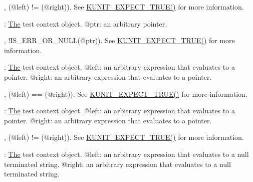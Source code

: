 \begin{DoxyRefList}
\label{test__test000035}%
%
, (@left) != (@right)). See \mbox{\hyperlink{test_8h_a0dcf3441be7037d8702d620899bf33fa}{K\+U\+N\+I\+T\+\_\+\+E\+X\+P\+E\+C\+T\+\_\+\+T\+R\+U\+E()}} for more information.  
\item[Member \mbox{\hyperlink{test_8h_a646deaf74fd5cf9d59403cea89898414}{K\+U\+N\+I\+T\+\_\+\+E\+X\+P\+E\+C\+T\+\_\+\+N\+O\+T\+\_\+\+E\+R\+R\+\_\+\+O\+R\+\_\+\+N\+U\+LL}} (test, ptr)]\label{test__test000050}%
%
\+: \mbox{\hyperlink{classThe}{The}} test context object. @ptr\+: an arbitrary pointer.

\label{test__test000051}%
%
, !\+I\+S\+\_\+\+E\+R\+R\+\_\+\+O\+R\+\_\+\+N\+U\+LL(@ptr)). See \mbox{\hyperlink{test_8h_a0dcf3441be7037d8702d620899bf33fa}{K\+U\+N\+I\+T\+\_\+\+E\+X\+P\+E\+C\+T\+\_\+\+T\+R\+U\+E()}} for more information.  
\item[Member \mbox{\hyperlink{test_8h_aabda78f7e9293675d88f896d4dcf4f0f}{K\+U\+N\+I\+T\+\_\+\+E\+X\+P\+E\+C\+T\+\_\+\+P\+T\+R\+\_\+\+EQ}} (test, left, right)]\label{test__test000032}%
%
\+: \mbox{\hyperlink{classThe}{The}} test context object. @left\+: an arbitrary expression that evaluates to a pointer. @right\+: an arbitrary expression that evaluates to a pointer.

\label{test__test000033}%
%
, (@left) == (@right)). See \mbox{\hyperlink{test_8h_a0dcf3441be7037d8702d620899bf33fa}{K\+U\+N\+I\+T\+\_\+\+E\+X\+P\+E\+C\+T\+\_\+\+T\+R\+U\+E()}} for more information.  
\item[Member \mbox{\hyperlink{test_8h_aedf3dcf5a78b6e4bfb4eb0c757ae3c13}{K\+U\+N\+I\+T\+\_\+\+E\+X\+P\+E\+C\+T\+\_\+\+P\+T\+R\+\_\+\+NE}} (test, left, right)]\label{test__test000036}%
%
\+: \mbox{\hyperlink{classThe}{The}} test context object. @left\+: an arbitrary expression that evaluates to a pointer. @right\+: an arbitrary expression that evaluates to a pointer.

\label{test__test000037}%
%
, (@left) != (@right)). See \mbox{\hyperlink{test_8h_a0dcf3441be7037d8702d620899bf33fa}{K\+U\+N\+I\+T\+\_\+\+E\+X\+P\+E\+C\+T\+\_\+\+T\+R\+U\+E()}} for more information.  
\item[Member \mbox{\hyperlink{test_8h_a6248e3552478a1f4e6869aac62573fd1}{K\+U\+N\+I\+T\+\_\+\+E\+X\+P\+E\+C\+T\+\_\+\+S\+T\+R\+EQ}} (test, left, right)]\label{test__test000046}%
%
\+: \mbox{\hyperlink{classThe}{The}} test context object. @left\+: an arbitrary expression that evaluates to a null terminated string. @right\+: an arbitrary expression that evaluates to a null terminated string.


\end{DoxyRefList}

